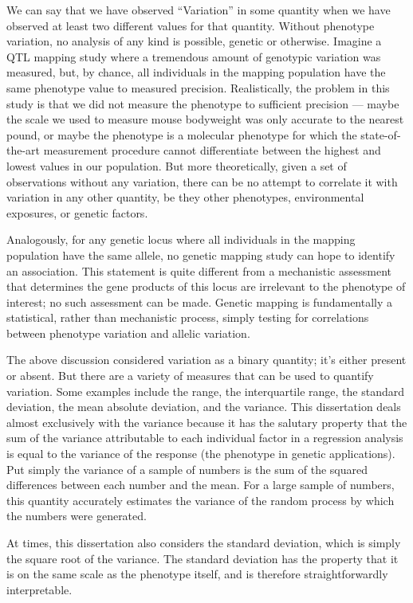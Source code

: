 We can say that we have observed ``Variation'' in some quantity when we have observed at least two different values for that quantity.
Without phenotype variation, no analysis of any kind is possible, genetic or otherwise.
Imagine a QTL mapping study where a tremendous amount of genotypic variation was measured, but, by chance, all individuals in the mapping population have the same phenotype value to measured precision.
Realistically, the problem in this study is that we did not measure the phenotype to sufficient precision --- maybe the scale we used to measure mouse bodyweight was only accurate to the nearest pound, or maybe the phenotype is a molecular phenotype for which the state-of-the-art measurement procedure cannot differentiate between the highest and lowest values in our population.
But more theoretically, given a set of observations without any variation, there can be no attempt to correlate it with variation in any other quantity, be they other phenotypes, environmental exposures, or genetic factors.

Analogously, for any genetic locus where all individuals in the mapping population have the same allele, no genetic mapping study can hope to identify an association.
This statement is quite different from a mechanistic assessment that determines the gene products of this locus are irrelevant to the phenotype of interest; no such assessment can be made.
Genetic mapping is fundamentally a statistical, rather than mechanistic process, simply testing for correlations between phenotype variation and allelic variation.

The above discussion considered variation as a binary quantity; it's either present or absent.
But there are a variety of measures that can be used to quantify variation.
Some examples include the range, the interquartile range, the standard deviation, the mean absolute deviation, and the variance.
This dissertation deals almost exclusively with the variance because it has the salutary property that the sum of the variance attributable to each individual factor in a regression analysis is equal to the variance of the response (the phenotype in genetic applications).
Put simply the variance of a sample of numbers is the sum of the squared differences between each number and the mean.
For a large sample of numbers, this quantity accurately estimates the variance of the random process by which the numbers were generated.

At times, this dissertation also considers the standard deviation, which is simply the square root of the variance.
The standard deviation has the property that it is on the same scale as the phenotype itself, and is therefore straightforwardly interpretable.

